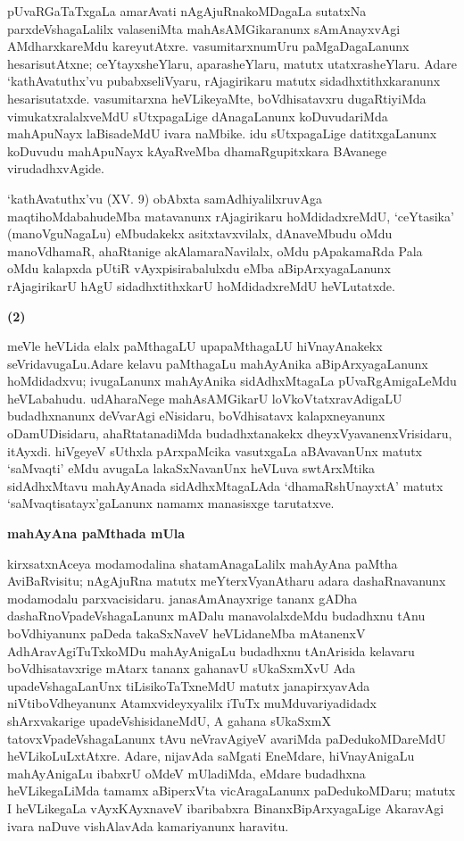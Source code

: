 pUvaRGaTaTxgaLa amarAvati nAgAjuRnakoMDagaLa sutatxNa parxdeVshagaLalilx valase\-niMta mahAsAMGikaranunx sAmAnayxvAgi AMdharxkareMdu kareyutAtxre. vasumitarxnu\break mUru paMgaDagaLanunx hesarisutAtxne; ceYtayxsheYlaru, aparasheYlaru, matutx utatxrasheYlaru. Adare `kathAvatuthx'vu pubabxseliVyaru, rAjagirikaru matutx sidadhxtithxkaranunx hesarisutatxde. vasumitarxna heVLikeyaMte, boVdhisatavxru dugaRtiyiMda vimukatxralalxveMdU sUtxpa\-gaLige dAnagaLanunx koDuvudariMda mahApuNayx laBisadeMdU ivara naMbike. idu sUtxpagaLige datitxgaLanunx koDuvudu mahApuNayx kAyaRveMba dhamaRgupitxkara BAvanege virudadhxvAgide.

`kathAvatuthx'vu {\rm (XV. 9)} obAbxta samAdhiyalilxruvAga maqtihoMdabahudeMba matavanunx rAjagirikaru hoMdidadxreMdU, `ceYtasika' (manoVguNagaLu) eMbudakekx asitxtavxvilalx, dAnaveMbudu oMdu manoVdhamaR, ahaRtanige akAlamaraNavilalx, oMdu pApakamaRda Pala oMdu kalapxda pUtiR vAyxpisirabalulxdu eMba aBipArxyagaLanunx rAjagirikarU hAgU sidadhxtithxkarU hoMdidadxreMdU heVLutatxde.

\begin{center}
{\textbf{\Large (2)}}
\end{center}

meVle heVLida elalx paMthagaLU upapaMthagaLU hiVnayAnakekx seVridavugaLu.\break Adare kelavu paMthagaLu mahAyAnika aBipArxyagaLanunx hoMdidadxvu; ivugaLanunx mahA\-yAnika sidAdhxMtagaLa pUvaRgAmigaLeMdu heVLabahudu. udAharaNege mahA\-sAMGikarU loVkoVtatxravAdigaLU budadhxnanunx deVvarAgi eNisidaru, boVdhisatavx kalapxneyanunx oDamUDisidaru, ahaRtatanadiMda budadhxtanakekx dheyxVyavanenxVrisidaru, itAyxdi. hiVgeyeV sUthxla pArxpaMcika vasutxgaLa aBAvavanUnx matutx `saMvaqti' eMdu avugaLa lakaSxNavanUnx heVLuva swtArxMtika sidAdhxMtavu mahAyAnada sidAdhxMtagaLAda `dhamaRshUnayxtA' matutx `saMvaqtisatayx'gaLanunx namamx manasisxge tarutatxve.

\begin{center}
{\textbf{\Large mahAyAna paMthada mUla}}
\end{center}

kirxsatxnAceya modamodalina shatamAnagaLalilx mahAyAna paMtha AviBaRvi\-situ; nAgAjuRna matutx meYterxVyanAtharu adara dashaRnavanunx modamodalu parxvacisidaru. janasAmAnayxrige tananx gADha dashaRnoVpadeVshagaLanunx mADalu manavolalxdeMdu budadhxnu tAnu boVdhiyanunx paDeda takaSxNaveV heVLidaneMba mAtanenxV AdhAravAgiTuTxkoMDu mahAyAnigaLu budadhxnu tAnArisida kelavaru boVdhisatavxrige mAtarx tananx gahanavU sUkaSxmXvU Ada upadeVshagaLanUnx tiLisikoTaTxneMdU matutx janapirxyavAda niVtiboVdheyanunx Atamxvideyxyalilx iTuTx muMduvariyadidadx shArxvakarige upadeVshisidaneMdU, A gahana sUkaSxmX tatovxVpadeVshagaLanunx tAvu neVravAgiyeV avariMda paDedukoMDareMdU heVLikoLuLxtAtxre. Adare, nijavAda saMgati EneMdare, hiVnayAnigaLu mahAyAnigaLu ibabxrU oMdeV mUladiMda, eMdare budadhxna heVLikegaLiMda tamamx aBiperxVta vicAragaLanunx paDedukoMDaru; matutx I heVLikegaLa vAyxKAyxnaveV ibaribabxra BinanxBipArxyagaLige AkaravAgi ivara naDuve vishAlavAda kamariyanunx haravitu.

